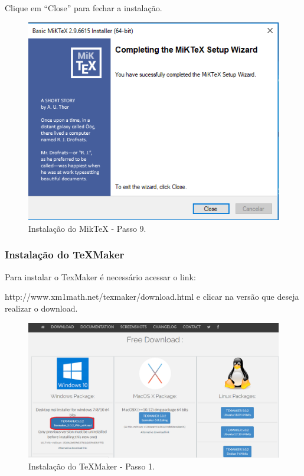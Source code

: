 \newpage
Clique em “Close” para fechar a instalação.

\begin{figure}[htb]
  \begin{center}
    \includegraphics[scale=0.7]{imagens/miktex/miktex9.png}
  \end{center}
  \caption{Instalação do MikTeX - Passo 9.}
  \label{mt9}
\end{figure}

\subsubsection{Instalação do TeXMaker}
Para instalar o TexMaker é necessário acessar o link:

http://www.xm1math.net/texmaker/download.html e clicar na versão que deseja realizar o download.\\

\begin{figure}[htb]
  \begin{center}
    \includegraphics[scale=0.35]{imagens/texmaker/texmaker1.png}
  \end{center}
  \caption{Instalação do TeXMaker - Passo 1.}
  \label{tmk1}
\end{figure}

